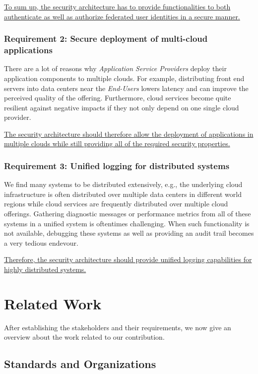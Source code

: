 \documentclass{llncs}
\begin{document}
\ul{To sum up, the security architecture has to provide functionalities to both authenticate as well as authorize federated user identities in a secure manner.}

\subsubsection{Requirement 2: Secure deployment of multi-cloud applications}

There are a lot of reasons why \textit{Application Service Providers} deploy their application components to multiple clouds. For example, distributing front end servers into data centers near the \textit{End-Users} lowers latency and can improve the perceived quality of the offering. Furthermore, cloud services become quite resilient against negative impacts if they not only depend on one single cloud provider.

\ul{The security architecture should therefore allow the deployment of applications in multiple clouds while still providing all of the required security properties.}

\subsubsection{Requirement 3: Unified logging for distributed systems}

We find many systems to be distributed extensively, e.g., the underlying cloud infrastructure is often distributed over multiple data centers in different world regions while cloud services are frequently distributed over multiple cloud offerings. Gathering diagnostic messages or performance metrics from all of these systems in a unified system is oftentimes challenging. When such functionality is not available, debugging these systems as well as providing an audit trail becomes a very tedious endevour.

\ul{Therefore, the security architecture should provide unified logging capabilities for highly distributed systems.}

\section{Related Work}
\label{sec:related-work}

After establishing the stakeholders and their requirements, we now give an overview about the work related to our contribution.

\subsection{Standards and Organizations}
\end{document}
